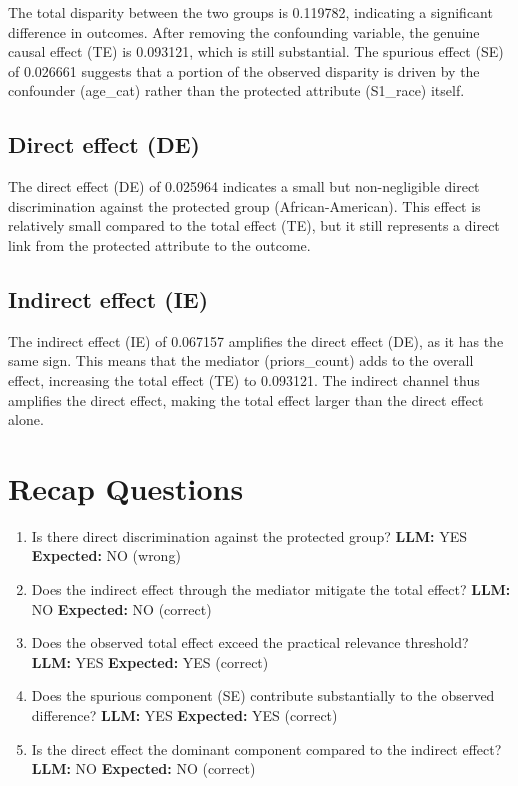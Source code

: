 \documentclass[11pt]{article}
\begin{document}
The total disparity between the two groups is 0.119782, indicating a significant difference in outcomes. After removing the confounding variable, the genuine causal effect (TE) is 0.093121, which is still substantial. The spurious effect (SE) of 0.026661 suggests that a portion of the observed disparity is driven by the confounder (age\_cat) rather than the protected attribute (S1\_race) itself.

\subsection{Direct effect (DE)}

The direct effect (DE) of 0.025964 indicates a small but non-negligible direct discrimination against the protected group (African-American). This effect is relatively small compared to the total effect (TE), but it still represents a direct link from the protected attribute to the outcome.

\subsection{Indirect effect (IE)}

The indirect effect (IE) of 0.067157 amplifies the direct effect (DE), as it has the same sign. This means that the mediator (priors\_count) adds to the overall effect, increasing the total effect (TE) to 0.093121. The indirect channel thus amplifies the direct effect, making the total effect larger than the direct effect alone.

\section{Recap Questions}

\begin{enumerate}
\item Is there direct discrimination against the protected group? \textbf{LLM:} YES \quad \textbf{Expected:} NO \quad (wrong)
\item Does the indirect effect through the mediator mitigate the total effect? \textbf{LLM:} NO \quad \textbf{Expected:} NO \quad (correct)
\item Does the observed total effect exceed the practical relevance threshold? \textbf{LLM:} YES \quad \textbf{Expected:} YES \quad (correct)
\item Does the spurious component (SE) contribute substantially to the observed difference? \textbf{LLM:} YES \quad \textbf{Expected:} YES \quad (correct)
\item Is the direct effect the dominant component compared to the indirect effect? \textbf{LLM:} NO \quad \textbf{Expected:} NO \quad (correct)
\end{enumerate}
\end{document}
